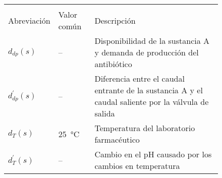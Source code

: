 \begin{figure}[!h]
    \centering
    \setlength\extrarowheight{3mm}
    \begin{tabular}{>{\centering\arraybackslash}p{3cm}>{\centering\arraybackslash}p{3cm}p{10cm}}
        \toprule\\[-2.5em]
        Abreviación & Valor común &Descripción\\
        \midrule
        $d_{dp}(s)$ & -- & Disponibilidad de la sustancia A y demanda de producción del antibiótico\\
        $d ^{\prime} _{dp}(s)$ & -- & Diferencia entre el caudal entrante de la sustancia A y el caudal saliente por la válvula de salida\\
        $d _{T}(s)$ & \SI{25}{\celsius}& Temperatura del laboratorio farmacéutico\\
        $d ^{\prime} _{T}(s)$ & -- & Cambio en el pH causado por los cambios en temperatura\\

        \bottomrule
    \end{tabular}
    \label{t3}
\end{figure}

